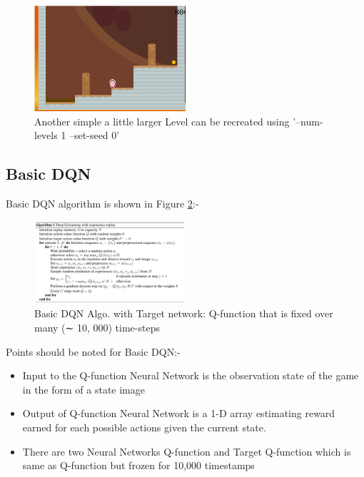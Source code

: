 \documentclass[10pt,twocolumn,letterpaper]{article}
\begin{document}
\begin{figure}[h]
   \centering
    \includegraphics[width=0.50\textwidth]{images/med_seed0.png}
    \caption{Another simple a little larger Level can be recreated using '--num-levels 1 --set-seed 0' }
    \label{fig:simplecoinrun2}
\end{figure}


\subsection{Basic DQN}

Basic DQN algorithm is shown in Figure \ref{fig:dqn_algo}:-

\begin{figure}[h]
   \centering
    \includegraphics[width=0.50\textwidth]{images/dqn.png}
    \caption{Basic DQN Algo. with Target network: Q-function that is fixed over many (∼ 10, 000)
time-steps}
    \label{fig:dqn_algo}
\end{figure}

Points should be noted for Basic DQN:-
\begin{itemize}
  \item Input to the Q-function Neural Network is the observation state of the game in the form of a state image
  \item Output of Q-function Neural Network is a 1-D array estimating reward earned for each possible actions given the current state.
  \item There are two Neural Networks Q-function and Target Q-function which is same as Q-function but frozen for 10,000 timestamps
\end{itemize}
\end{document}
